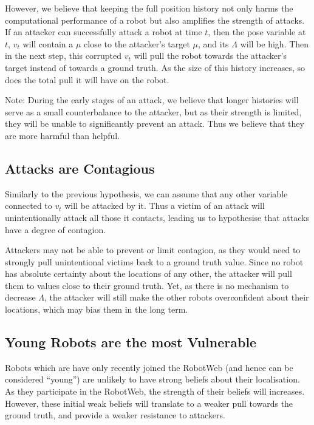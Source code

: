 However, we believe that keeping the full position history not only harms the computational performance of a robot but also amplifies the strength of attacks. If an attacker can successfully attack a robot at time $t$, then the pose variable at $t$, $v_t$ will contain a $\mu$ close to the attacker's target $\mu$, and its $\Lambda$ will be high. Then in the next step, this corrupted $v_t$ will pull the robot towards the attacker's target instead of towards a ground truth. As the size of this history increases, so does the total pull it will have on the robot.

Note: During the early stages of an attack, we believe that longer histories will serve as a small counterbalance to the attacker, but as their strength is limited, they will be unable to significantly prevent an attack. Thus we believe that they are more harmful than helpful.

\subsection{Attacks are Contagious} \label{hyp:contagion} %
Similarly to the previous hypothesis, we can assume that any other variable connected to $v_t$ will be attacked by it. Thus a victim of an attack will unintentionally attack all those it contacts, leading us to hypothesise that attacks have a degree of contagion. 

Attackers may not be able to prevent or limit contagion, as they would need to strongly pull unintentional victims back to a ground truth value. Since no robot has absolute certainty about the locations of any other, the attacker will pull them to values close to their ground truth. Yet, as there is no mechanism to decrease $\Lambda$, the attacker will still make the other robots overconfident about their locations, which may bias them in the long term.

\subsection{Young Robots are the most Vulnerable} \label{hyp:startup_vuln}
Robots which are have only recently joined the RobotWeb (and hence can be considered ``young'') are unlikely to have strong beliefs about their localisation. As they participate in the RobotWeb, the strength of their beliefs will increases. However, these initial weak beliefs will translate to a weaker pull towards the ground truth, and provide a weaker resistance to attackers.

